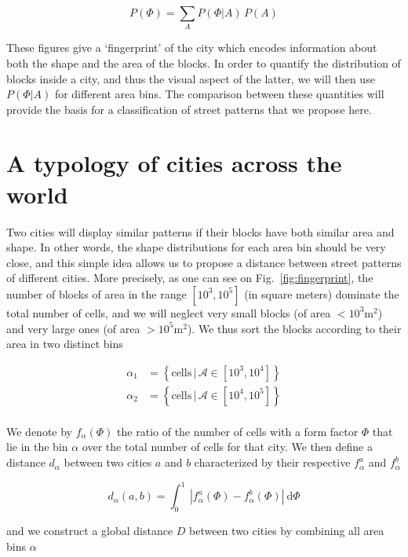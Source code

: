 \begin{equation} 
    P(\Phi)=\sum_AP(\Phi|A)\,P(A) 
\end{equation}

These figures give a `fingerprint' of the city which encodes information about
both the shape and the area of the blocks. In order to quantify the distribution
of blocks inside a city, and thus the visual aspect of the latter, we will then
use $P(\Phi|A)$ for different area bins. The comparison between these quantities
will provide the basis for a classification of street patterns that we propose
here.


\section{A typology of cities across the world}

Two cities will display similar patterns if their blocks have both similar area
and shape. In other words, the shape distributions for each area bin should be
very close, and this simple idea allows us to propose a distance between street
patterns of different cities. More precisely, as one can see on
Fig.~\ref{fig:fingerprint}, the number of blocks of area in the range
$[10^3,10^5]$ (in square meters) dominate the total number of cells, and we will
neglect very small blocks (of area $<10^3\text{m}^2$) and very large ones (of
area $>10^5\text{m}^2$). We thus sort the blocks according to their area in two
distinct bins

\begin{align*} 
    \alpha_1 &= \left\{ \text{cells}\, |\, \mathcal{A} \in \left[10^3,
10^4\right]\right\}\\ 
    \alpha_2 &= \left\{ \text{cells}\, |\, \mathcal{A} \in
\left[10^4, 10^5\right]\right\}\\ 
\end{align*}

We denote by $f_\alpha(\Phi)$ the ratio of the number of cells with a form
factor $\Phi$ that lie in the bin $\alpha$ over the total number of cells for
that city. We then define a distance $d_\alpha$ between two cities $a$ and $b$
characterized by their respective $f^{a}_\alpha$ and $f^{b}_\alpha$

\begin{equation} 
    d_\alpha(a,b) = \int_0^1\: | f^{a}_\alpha(\Phi) -
f^{b}_\alpha(\Phi) |\: \mathrm{d}\Phi 
\end{equation} 

and we construct a global distance $D$ between two cities by combining all area
bins $\alpha$

